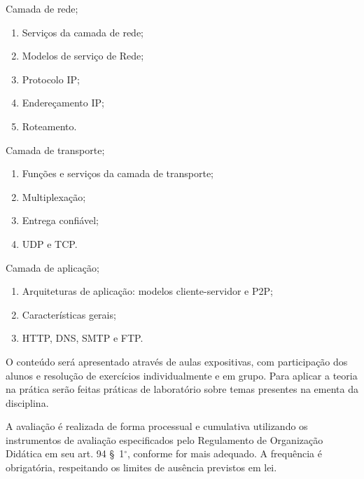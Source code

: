\begin{pud}
\begin{description}[itemsep=0em]
         \item[UNIDADE IV:] Camada de  rede;
	         \begin{enumerate}[itemsep=0em, topsep=0em]
                \item Serviços da camada de rede;
                \item Modelos de serviço de Rede;
                \item Protocolo IP;
                \item Endereçamento IP;
                \item Roteamento.
            \end{enumerate}

         \item[UNIDADE V:] Camada de  transporte;
	         \begin{enumerate}[itemsep=0em, topsep=0em]
                \item Funções e serviços da camada de transporte;
                \item Multiplexação;
                \item Entrega confiável;
                \item UDP e TCP.
            \end{enumerate}
            
         \item[UNIDADE VI:] Camada de  aplicação;
	         \begin{enumerate}[itemsep=0em, topsep=0em]
            	\item Arquiteturas de aplicação: modelos cliente-servidor e P2P;
            	\item Características gerais;
            	\item HTTP, DNS, SMTP e FTP.
            \end{enumerate}
                                    
	\end{description}	
	
	\metodologia
	O conteúdo será apresentado através de aulas expositivas, com participação dos alunos e resolução de exercícios individualmente e em grupo. Para aplicar a teoria na prática serão feitas práticas de laboratório sobre temas presentes na ementa da disciplina.


	\avaliacao
	A avaliação é realizada de forma processual e cumulativa utilizando os instrumentos de avaliação especificados pelo Regulamento de Organização Didática em seu art. 94 \S~1$^\circ$, conforme for mais adequado. A frequência é obrigatória, respeitando os limites de ausência previstos em lei.
	\naopresencial
		

\end{pud}

